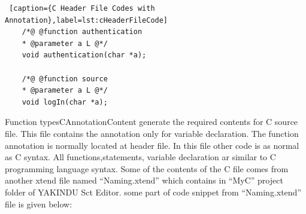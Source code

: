 \begin{lstlisting} [caption={C Header File Codes with Annotation},label=lst:cHeaderFileCode]
	/*@ @function authentication
	* @parameter a L @*/
	void authentication(char *a);
	
	/*@ @function source
	* @parameter a L @*/
	void logIn(char *a);
\end{lstlisting}

Function typesCAnnotationContent generate the required contents for C source file. This file contains the annotation only for variable declaration. The function annotation is normally located at header file. In this file other code is as normal as C syntax. All functions,statements, variable declaration ar similar to C programming language syntax. Some of the contents of the C file comes from another xtend file named \enquote{Naming.xtend} which contains in \enquote{MyC} project folder of YAKINDU Sct Editor. some part of code snippet from \enquote{Naming.xtend} file is given below:

